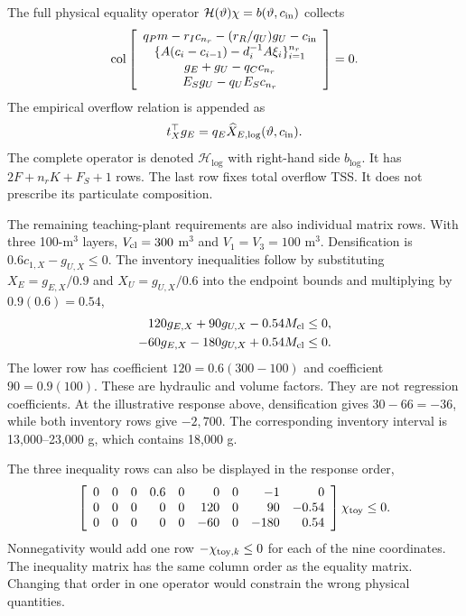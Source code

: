 The full physical equality operator $\mathcal H(\vartheta)\chi=b(\vartheta,c_{\rm in})$ collects
\begin{equation}
\operatorname{col}\left[
\begin{array}{c}
q_Pm-r_Ic_{n_r}-(r_R/q_U)g_U-c_{\rm in}\\
\{A(c_i-c_{i-1})-d_i^{-1}A\xi_i\}_{i=1}^{n_r}\\
g_E+g_U-q_Cc_{n_r}\\
E_Sg_U-q_UE_Sc_{n_r}
\end{array}\right]=0.
\label{eq:plant_projection_equalities}
\end{equation}
The empirical overflow relation is appended as
\begin{equation}
t_X^\top g_E=q_E\widehat X_{E,\log}(\vartheta,c_{\rm in}).
\label{eq:plant_overflow_closure}
\end{equation}
The complete operator is denoted $\mathcal H_{\log}$ with right-hand side $b_{\log}$. It has $2F+n_rK+F_S+1$ rows. The last row fixes total overflow TSS. It does not prescribe its particulate composition.

The remaining teaching-plant requirements are also individual matrix rows. With three 100-m$^3$ layers, $V_{\rm cl}=300$ m$^3$ and $V_1=V_3=100$ m$^3$. Densification is $0.6c_{1,X}-g_{U,X}\le0$. The inventory inequalities follow by substituting $X_E=g_{E,X}/0.9$ and $X_U=g_{U,X}/0.6$ into the endpoint bounds and multiplying by $0.9(0.6)=0.54$,
\begin{align}
120g_{E,X}+90g_{U,X}-0.54M_{\rm cl}&\le0,\\
-60g_{E,X}-180g_{U,X}+0.54M_{\rm cl}&\le0.
\end{align}
The lower row has coefficient $120=0.6(300-100)$ and coefficient $90=0.9(100)$. These are hydraulic and volume factors. They are not regression coefficients. At the illustrative response above, densification gives $30-66=-36$, while both inventory rows give $-2{,}700$. The corresponding inventory interval is 13{,}000--23{,}000 g, which contains 18{,}000 g.

The three inequality rows can also be displayed in the response order,
\begin{equation}
\left[\begin{array}{rrrrrrrrr}
0&0&0&0.6&0&0&0&-1&0\\
0&0&0&0&0&120&0&90&-0.54\\
0&0&0&0&0&-60&0&-180&0.54
\end{array}\right]\chi_{\rm toy}\le0.
\end{equation}
Nonnegativity would add one row $-\chi_{{\rm toy},k}\le0$ for each of the nine coordinates. The inequality matrix has the same column order as the equality matrix. Changing that order in one operator would constrain the wrong physical quantities.

